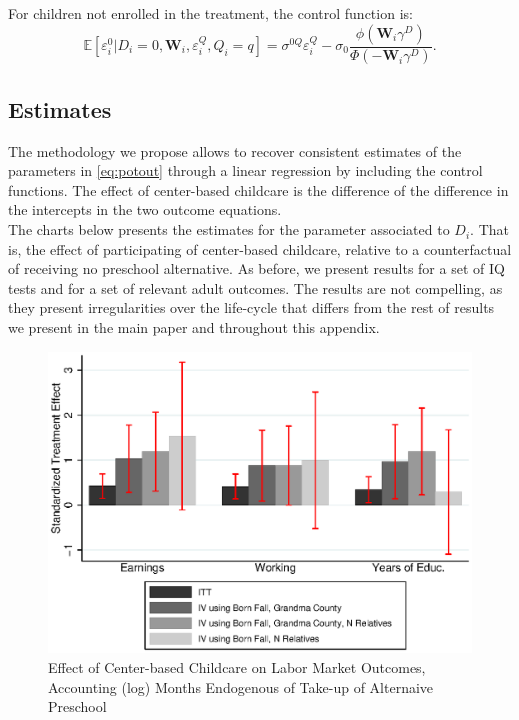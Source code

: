 \begin{appendices}
\noindent For children not enrolled in the treatment, the control function is:
\begin{equation}
\mathbb{E} \left[\varepsilon_i^0|D_i=0,\mathbf{W}_i,\varepsilon^{Q}_i,Q_i=q\right]= \sigma^{0Q}\varepsilon^{Q}_i - \sigma_0 \frac{\phi\left(\mathbf{W}_i\gamma^D\right)}{\Phi\left( - \mathbf{W}_{i} \gamma^D \right) }. \label{eq:home}
\end{equation}

\subsection{Estimates}

\noindent The methodology we propose allows to recover consistent estimates of the parameters in \eqref{eq:potout} through a linear regression by including the control functions. The effect of center-based childcare is the difference of the difference in the intercepts in the two outcome equations.\\

\noindent The charts below presents the estimates for the parameter associated to $D_i$. That is, the effect of participating of center-based childcare, relative to a counterfactual of receiving no preschool alternative. As before, we present results for a set of IQ tests and for a set of relevant adult outcomes. The results are not compelling, as they present irregularities over the life-cycle that differs from the rest of results we present in the main paper and throughout this appendix. 

\begin{figure}[H]
		\caption{Effect of Center-based Childcare on Labor Market Outcomes, Accounting (log) Months Endogenous of Take-up of Alternaive Preschool} \label{output/appendixplots/Q_cf_te.eps}
		\includegraphics[width=.5\columnwidth]{output/appendixplots/ins_inter_logQ_iv_other.eps}
\end{figure}


\end{appendices}
